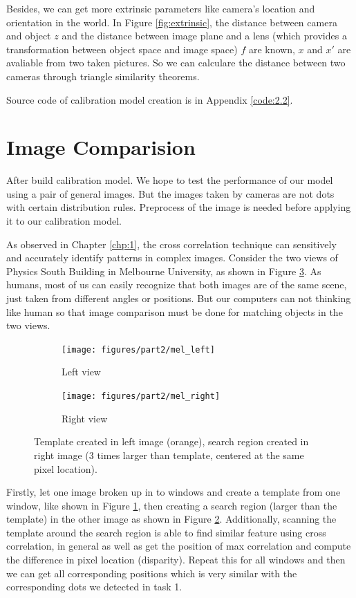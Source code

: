 Besides, we can get more extrinsic parameters like camera's location and orientation in the world. In Figure \ref{fig:extrinsic}, the distance between camera and object $z$ and the distance between image plane and a lens (which provides a transformation between object space and image space) $f$ are known, $x$ and $x'$ are avaliable from two taken pictures. So we can calculare the distance between two cameras through triangle similarity theorems.

Source code of calibration model creation is in Appendix \ref{code:2.2}.

\section{Image Comparision}

After build calibration model. We hope to test the performance of our model using a pair of general images. But the images taken by cameras are not dots with certain distribution rules. Preprocess of the image is needed before applying it to our calibration model. 

As observed in Chapter \ref{chp:1}, the cross correlation technique can sensitively and accurately identify patterns in complex images. Consider the two views of Physics South Building in Melbourne University, as shown in Figure \ref{fig:mel}. As humans, most of us can easily recognize that both images are of the same scene, just taken from different angles or positions. But our computers can not thinking like human so that image comparison must be done for matching objects in the two views. 

\begin{figure}[h!]
	\centering
	\begin{subfigure}[t]{0.48\linewidth}
		\centering
		\texttt{[image: figures/part2/mel\_left]}
		\caption{Left view}
		\label{fig:mel_left}
	\end{subfigure}
	\begin{subfigure}[t]{0.48\linewidth}
		\centering
		\texttt{[image: figures/part2/mel\_right]}
		\caption{Right view}
		\label{fig:mel_right}
	\end{subfigure}
	\caption{Template created in left image (orange), search region created in right image (3 times larger than template, centered at the same pixel location).}
	\label{fig:mel}
\end{figure}

Firstly, let one image broken up in to windows and create a template from one window, like shown in Figure \ref{fig:mel_left}, then creating a search region (larger than the template) in the other image as shown in Figure \ref{fig:mel_right}. Additionally, scanning the template around the search region is able to find similar feature using cross correlation, in general as well as get the position of max correlation and compute the difference in pixel location (disparity). Repeat this for all windows and then we can get all corresponding positions which is very similar with the corresponding dots we detected in task 1.

